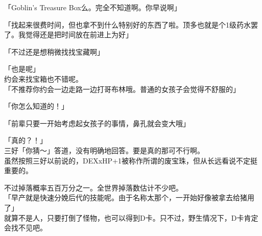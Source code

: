 「Goblin's Treasure Box么。完全不知道啊。你早说啊」

「找起来很费时间，但也拿不到什么特别好的东西了啦。顶多也就是个1级药水罢了。我觉得还是把时间放在前进上为好」

「不过还是想稍微找找宝藏啊」

「也是呢」\\

约会来找宝箱也不错呢。\\

「不推荐你约会一边走路一边打哥布林哦。普通的女孩子会觉得不舒服的」

「你怎么知道的！」

「前辈只要一开始考虑起女孩子的事情，鼻孔就会变大哦」

「真的？！」\\

三好「你猜～」答道，没有明确地回答。要是真的那可不行啊。\\

虽然按照三好以前说的，DEXxHP+1被称作所谓的废宝珠，但从长远看说不定挺重要的。

不过掉落概率五百万分之一。全世界掉落数估计不少吧。\\

「早产就是快速分娩后代的技能呢。由于名称太那个，一开始好像被拿去给猪用了」\\

就算不是人，只要打倒了怪物，也可以得到D卡。只不过，野生情况下，D卡肯定会找不见吧。


